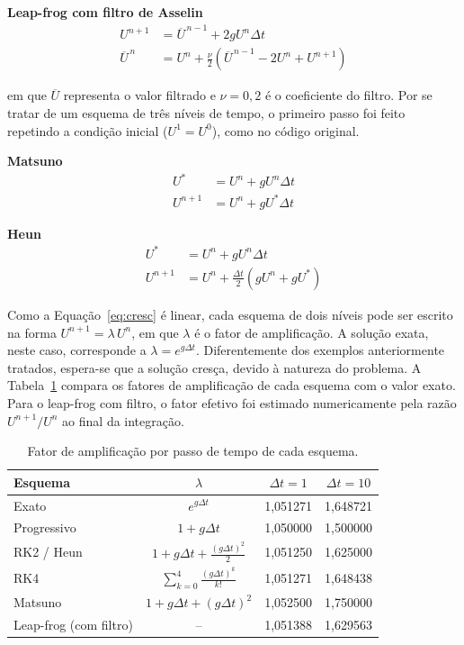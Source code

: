 \documentclass[11pt,a4paper]{article}
\begin{document}
\textbf{Leap-frog com filtro de Asselin}
\begin{equation}
\begin{aligned}
U^{n+1} &= \overline{U}^{\,n-1} + 2 g U^{n} \Delta t \\
\overline{U}^{\,n} &= U^{n} + \frac{\nu}{2}\left( \overline{U}^{\,n-1} - 2U^{n} + U^{n+1} \right)
\end{aligned}
\end{equation}

\noindent em que $\overline{U}$ representa o valor filtrado e $\nu = 0{,}2$ é o coeficiente do filtro. Por se tratar de um esquema de três níveis de tempo, o primeiro passo foi feito repetindo a condição inicial ($U^{1} = U^{0}$), como no código original.

\textbf{Matsuno}
\begin{equation}
\begin{aligned}
U^{*} &= U^{n} + g U^{n} \Delta t \\
U^{n+1} &= U^{n} + g U^{*} \Delta t
\end{aligned}
\end{equation}

\textbf{Heun}
\begin{equation}
\begin{aligned}
U^{*} &= U^{n} + g U^{n} \Delta t \\
U^{n+1} &= U^{n} + \frac{\Delta t}{2}\left( g U^{n} + g U^{*} \right)
\end{aligned}
\end{equation}

Como a Equação~\ref{eq:cresc} é linear, cada esquema de dois níveis pode ser escrito na forma $U^{n+1} = \lambda\,U^{n}$, em que $\lambda$ é o fator de amplificação. A solução exata, neste caso, corresponde a $\lambda = e^{g\Delta t}$. Diferentemente dos exemplos anteriormente tratados, espera-se que a solução cresça, devido à natureza do problema. A Tabela~\ref{tab:amplif} compara os fatores de amplificação de cada esquema com o valor exato. Para o leap-frog com filtro, o fator efetivo foi estimado numericamente pela razão $U^{n+1}/U^{n}$ ao final da integração.

\begin{table}[htbp]
\centering
\caption{Fator de amplificação por passo de tempo de cada esquema.}
\label{tab:amplif}
\begin{tabular}{lccc}
\hline
Esquema & $\lambda$ & $\Delta t = 1$ & $\Delta t = 10$ \\
\hline
Exato                  & $e^{g\Delta t}$ & 1,051271 & 1,648721 \\
Progressivo            & $1 + g\Delta t$ & 1,050000 & 1,500000 \\
RK2 / Heun             & $1 + g\Delta t + \frac{(g\Delta t)^2}{2}$ & 1,051250 & 1,625000 \\
RK4                    & $\sum_{k=0}^{4} \frac{(g\Delta t)^k}{k!}$ & 1,051271 & 1,648438 \\
Matsuno                & $1 + g\Delta t + (g\Delta t)^2$ & 1,052500 & 1,750000 \\
Leap-frog (com filtro) & -- & 1,051388 & 1,629563 \\
\hline
\end{tabular}
\end{table}
\end{document}
